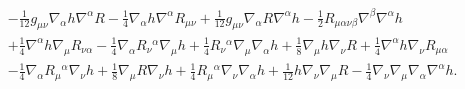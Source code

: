 \documentclass[10pt,letterpaper]{article}
\begin{document}
\begin{align}
& -  \tfrac{1}{12} g_{\mu \nu} \nabla_{\alpha}h \nabla^{\alpha}R
 -  \tfrac{1}{4} \nabla_{\alpha}h \nabla^{\alpha}R_{\mu \nu}
 + \tfrac{1}{12} g_{\mu \nu} \nabla_{\alpha}R \nabla^{\alpha}h
 -  \tfrac{1}{2} R_{\mu \alpha \nu \beta} \nabla^{\beta}\nabla^{\alpha}h\nonumber\\
& + \tfrac{1}{4} \nabla^{\alpha}h \nabla_{\mu}R_{\nu \alpha}
 -  \tfrac{1}{4} \nabla_{\alpha}R_{\nu}{}^{\alpha} \nabla_{\mu}h
 + \tfrac{1}{4} R_{\nu}{}^{\alpha} \nabla_{\mu}\nabla_{\alpha}h
 + \tfrac{1}{8} \nabla_{\mu}h \nabla_{\nu}R
 + \tfrac{1}{4} \nabla^{\alpha}h \nabla_{\nu}R_{\mu \alpha}\nonumber\\
& -  \tfrac{1}{4} \nabla_{\alpha}R_{\mu}{}^{\alpha} \nabla_{\nu}h
 + \tfrac{1}{8} \nabla_{\mu}R \nabla_{\nu}h
 + \tfrac{1}{4} R_{\mu}{}^{\alpha} \nabla_{\nu}\nabla_{\alpha}h
 + \tfrac{1}{12} h \nabla_{\nu}\nabla_{\mu}R
 -  \tfrac{1}{4} \nabla_{\nu}\nabla_{\mu}\nabla_{\alpha}\nabla^{\alpha}h.
\end{align}
\end{document}
